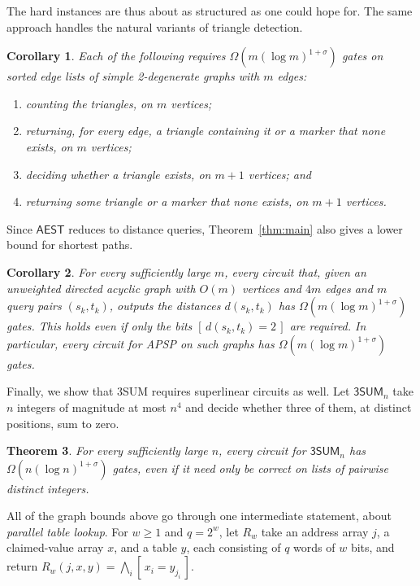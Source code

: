 \documentclass[11pt]{article}
\newtheorem{theorem}{Theorem}[section]
\newtheorem{corollary}[theorem]{Corollary}
\theoremstyle{definition}
\theoremstyle{remark}
\newcommand{\AEST}{\mathsf{AEST}}
\newcommand{\TSUM}{\mathsf{3SUM}}
\newcommand{\ind}[1]{[\,#1\,]}
\begin{document}
The hard instances are thus about as structured as one could hope for.
The same approach handles the natural variants of triangle detection.

\begin{corollary}\label{cor:variants}
Each of the following requires $\Omega(m(\log m)^{1+\sigma})$ gates on
sorted edge lists of simple 2-degenerate graphs with $m$ edges:
\begin{enumerate}
\item counting the triangles, on $m$ vertices;
\item returning, for every edge, a triangle containing it or a marker that
none exists, on $m$ vertices;
\item deciding whether a triangle exists, on $m+1$ vertices; and
\item returning some triangle or a marker that none exists, on $m+1$
vertices.
\end{enumerate}
\end{corollary}

Since $\AEST$ reduces to distance queries, Theorem~\ref{thm:main} also
gives a lower bound for shortest paths.

\begin{corollary}\label{cor:apsp}
For every sufficiently large $m$, every circuit that, given an unweighted
directed acyclic graph with $O(m)$ vertices and $4m$ edges and $m$ query
pairs $(s_k,t_k)$, outputs the distances $d(s_k,t_k)$ has
$\Omega(m(\log m)^{1+\sigma})$ gates. This holds even if only the bits
$\ind{d(s_k,t_k)=2}$ are required. In particular, every circuit for APSP
on such graphs has $\Omega(m(\log m)^{1+\sigma})$ gates.
\end{corollary}

Finally, we show that 3SUM requires superlinear circuits as well. Let
$\TSUM_n$ take $n$ integers of magnitude at most $n^4$ and decide whether
three of them, at distinct positions, sum to zero.

\begin{theorem}\label{thm:3sum-intro}
For every sufficiently large $n$, every circuit for $\TSUM_n$ has
$\Omega(n(\log n)^{1+\sigma})$ gates, even if it need only be correct on
lists of pairwise distinct integers.
\end{theorem}

All of the graph bounds above go through one intermediate statement,
about \emph{parallel table lookup}. For $w\ge1$ and $q=2^w$, let
$R_w$ take an address array $j$, a claimed-value array $x$, and a
table $y$, each consisting of $q$ words of $w$ bits, and return
$R_w(j,x,y)=\bigwedge_{i}\ind{x_i=y_{j_i}}$.
\end{document}
